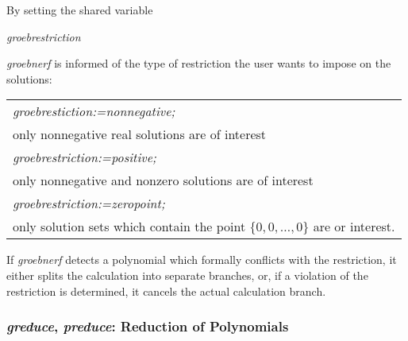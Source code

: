 By setting the shared variable
\hypertarget{reserved:GROEBRESTRICTION}{}
\begin{center} \emph{groebrestriction} \end{center}
\emph{groebnerf} is informed of the type of restriction the user wants to
impose on the solutions:
\begin{center}
\begin{tabular}{l}
{\it groebrestiction:=nonnegative;} \\
\hspace*{+.5cm} only nonnegative real solutions are of
interest\vspace*{4mm} \\
{\it groebrestriction:=positive;} \\
\hspace*{+.5cm}only nonnegative and nonzero solutions are of
interest\vspace*{4mm} \\
{\it groebrestriction:=zeropoint;} \\
\hspace*{+.5cm}only solution sets which contain the point
$\{0,0,\ldots,0\}$ are or interest.
\end{tabular}
\end{center}

If \emph{groebnerf} detects a polynomial which formally conflicts with the
restriction, it either splits the calculation into separate branches, or,
if a violation of the restriction is determined, it cancels the actual
calculation branch.

\subsubsection{\emph{greduce}, \emph{preduce}: Reduction of Polynomials}

